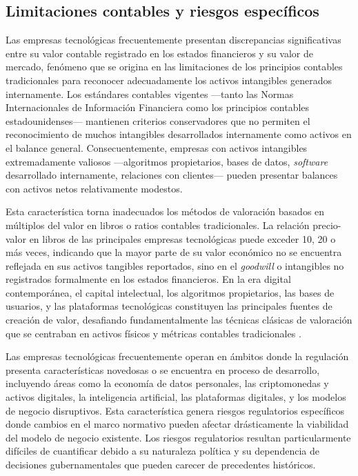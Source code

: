 \subsection{Limitaciones contables y riesgos específicos}

Las empresas tecnológicas frecuentemente presentan discrepancias significativas entre su valor contable registrado en los estados financieros y su valor de mercado, fenómeno que se origina en las limitaciones de los principios contables tradicionales para reconocer adecuadamente los activos intangibles generados internamente. Los estándares contables vigentes ---tanto las Normas Internacionales de Información Financiera como los principios contables estadounidenses--- mantienen criterios conservadores que no permiten el reconocimiento de muchos intangibles desarrollados internamente como activos en el balance general. Consecuentemente, empresas con activos intangibles extremadamente valiosos ---algoritmos propietarios, bases de datos, \emph{software} desarrollado internamente, relaciones con clientes--- pueden presentar balances con activos netos relativamente modestos.

Esta característica torna inadecuados los métodos de valoración basados en múltiplos del valor en libros o ratios contables tradicionales. La relación precio-valor en libros de las principales empresas tecnológicas puede exceder 10, 20 o más veces, indicando que la mayor parte de su valor económico no se encuentra reflejada en sus activos tangibles reportados, sino en el \emph{goodwill} o intangibles no registrados formalmente en los estados financieros. En la era digital contemporánea, el capital intelectual, los algoritmos propietarios, las bases de usuarios, y las plataformas tecnológicas constituyen las principales fuentes de creación de valor, desafiando fundamentalmente las técnicas clásicas de valoración que se centraban en activos físicos y métricas contables tradicionales \citep{haskel2017,lev2001}.

Las empresas tecnológicas frecuentemente operan en ámbitos donde la regulación presenta características novedosas o se encuentra en proceso de desarrollo, incluyendo áreas como la economía de datos personales, las criptomonedas y activos digitales, la inteligencia artificial, las plataformas digitales, y los modelos de negocio disruptivos. Esta característica genera riesgos regulatorios específicos donde cambios en el marco normativo pueden afectar drásticamente la viabilidad del modelo de negocio existente. Los riesgos regulatorios resultan particularmente difíciles de cuantificar debido a su naturaleza política y su dependencia de decisiones gubernamentales que pueden carecer de precedentes históricos.

